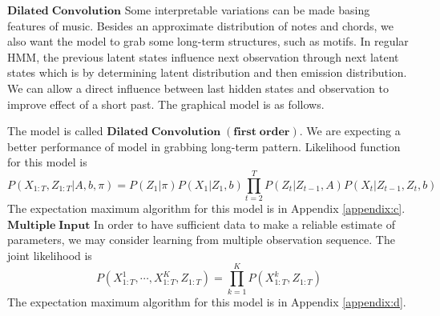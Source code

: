 \documentclass[10pt, oneside]{article}
\begin{document}
$\mathbf{Dilated\; Convolution}$
Some interpretable variations can be made basing features of music. Besides an approximate distribution of notes and chords, we also want the model to grab some long-term structures, such as motifs. In regular HMM, the previous latent states influence next observation through next latent states which is by determining latent distribution and then emission distribution. We can allow a direct influence between last hidden states and observation to improve effect of a short past. The graphical model is as follows. 

\begin{figure}[!htb]\centering
{}
\end{figure}

The model is called $\mathbf{Dilated\;Convolution\;(first \;order)}$. We are expecting a better performance of model in grabbing long-term pattern. Likelihood function for this model is 
$$
P\left(X_{1: T}, Z_{1: T}| A, b, \pi \right)=P\left(Z_{1}| \pi \right) P\left(X_{1} | Z_{1}, b \right) \prod_{t=2}^{T} P\left(Z_{t} | Z_{t-1}, A\right) P\left(X_{t} | Z_{t-1},  Z_{t},b\right)
$$
The expectation maximum algorithm for this model is in Appendix \ref{appendix:c}.\\

$\mathbf{Multiple\; Input}$
In order to have sufficient data to make a reliable estimate of parameters, we may consider learning from multiple observation sequence. The joint likelihood is 
$$
P(X^{1}_{1:T},\cdots, X^{K}_{1:T},Z_{1:T})=\prod_{k=1}^{K} P(X^{k}_{1:T}, Z_{1:T})
$$
The expectation maximum algorithm for this model is in Appendix \ref{appendix:d}.
\end{document}
